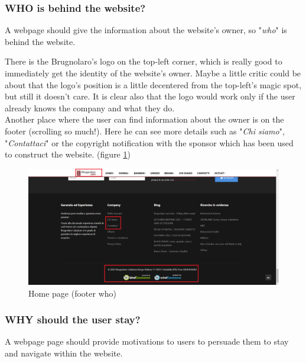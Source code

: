 \subsubsection{WHO is behind the website?}
A webpage should give the information about the website's owner, so "\textit{who}" is
behind the website.

There is the Brugnolaro's logo on the top-left corner, which is really good to immediately get the
identity of the website's owner. Maybe a little critic could be about that the logo's position
is a little decentered from the top-left's magic spot, but still it doesn't care. It is clear
also that the logo would work only if the user already knows the company and what they do.\\
Another place where the user can find information about the owner is on the footer (scrolling
so much!). Here he can see more details such as "\textit{Chi siamo}", "\textit{Contattaci}" or
the copyright notification with the sponsor which has been used to construct the website.
(figure \ref{home-page-scroll-3-circle})

\begin{figure}[!h] 
    \centering 
    \includegraphics[scale = 0.29]{images/hp_scroll3_circle.png} 
    \caption{Home page (footer who)}
    \label{home-page-scroll-3-circle}
\end{figure}

\subsubsection{WHY should the user stay?}
A webpage page should provide motivations to users to persuade them to stay and navigate within
the website.\\

